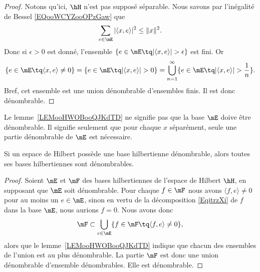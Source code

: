 \begin{proof}
    Notons qu'ici, \( \hH\) n'est pas supposé séparable. Nous savons par l'inégalité de Bessel \eqref{EQooWCYZooOPzGaw} que
    \begin{equation}
        \sum_{e\in\mE}| \langle x, e\rangle  |^2\leq \| x \|^2.
    \end{equation}
    Donc si \( \epsilon>0\) est donné, l'ensemble \( \{ e\in \mE\tq| \langle x, e\rangle  |>\epsilon \}\) est fini. Or
    \begin{equation}
        \{ e\in\mE\tq \langle x, e\rangle \neq 0  \}=\{ e\in\mE\tq| \langle x, e\rangle  |>0 \}=\bigcup_{n=1}^{\infty}\{ e\in\mE\tq | \langle x, e\rangle  |>\frac{1}{ n } \}.
    \end{equation}
    Bref, cet ensemble est une union dénombrable d'ensembles finis. Il est donc dénombrable.
\end{proof}

\begin{remark}
    Le lemme~\ref{LEMooHWOBooQJKdTD} ne signifie pas que la base \( \mE\) doive être dénombrable. Il signifie seulement que pour chaque \( x\) séparément, seule une partie dénombrable de \( \mE\) est nécessaire.
\end{remark}

\begin{corollary}       \label{CORooFROTooNupAQs}
    Si un espace de Hilbert possède une base hilbertienne dénombrable, alors toutes ses bases hilbertiennes sont dénombrables.
\end{corollary}

\begin{proof}
    Soient \( \mE\) et \( \mF\) des bases hilbertiennes de l'espace de Hilbert \( \hH\), en supposant que \( \mE\) soit dénombrable. Pour chaque \( f\in \mF\) nous avons \( \langle f, e\rangle \neq 0\) pour au moins un \( e\in\mE\), sinon en vertu de la décomposition \eqref{EqitrzXi} de \( f\) dans la base \( \mE\), nous aurions \( f=0\). Nous avons donc
    \begin{equation}    \label{EQooKRTFooNABXnH}
        \mF\subset\bigcup_{e\in \mE}\{ f\in\mF\tq \langle f, e\rangle \neq 0 \},
    \end{equation}
    alors que le lemme~\ref{LEMooHWOBooQJKdTD} indique que chacun des ensembles de l'union est au plus dénombrable. La partie \( \mF\) est donc une union dénombrable d'ensemble dénombrables. Elle est dénombrable.
\end{proof}

